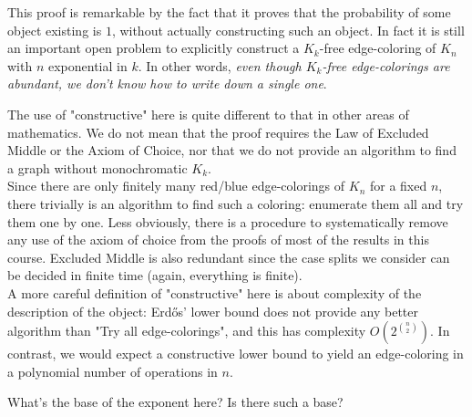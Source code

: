 \documentclass{article}
\begin{document}
This proof is remarkable by the fact that it proves that the probability of some object existing is $1$, without actually constructing such an object. In fact it is still an important open problem to explicitly construct a $K_k$-free edge-coloring of $K_n$ with $n$ exponential in $k$. In other words, {\it even though $K_k$-free edge-colorings are abundant, we don't know how to write down a single one}.

\begin{rmk}
  The use of "constructive" here is quite different to that in other areas of mathematics. We do not mean that the proof requires the Law of Excluded Middle or the Axiom of Choice, nor that we do not provide an algorithm to find a graph without monochromatic $K_k$. \\
  Since there are only finitely many red/blue edge-colorings of $K_n$ for a fixed $n$, there trivially is an algorithm to find such a coloring: enumerate them all and try them one by one. Less obviously, there is a procedure to systematically remove any use of the axiom of choice from the proofs of most of the results in this course. Excluded Middle is also redundant since the case splits we consider can be decided in finite time (again, everything is finite). \\
  A more careful definition of "constructive" here is about complexity of the description of the object: Erd\H os' lower bound does not provide any better algorithm than "Try all edge-colorings", and this has complexity $O\left(2^{\binom n 2}\right)$. In contrast, we would expect a constructive lower bound to yield an edge-coloring in a polynomial number of operations in $n$.
\end{rmk}

\begin{question}
  What's the base of the exponent here? Is there such a base?
\end{question}

\newlec

\printindex
\end{document}

